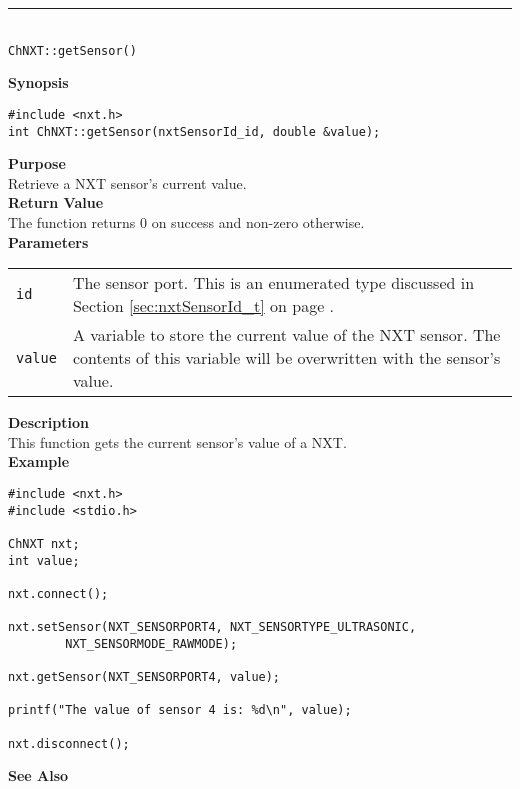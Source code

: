 \noindent
\vspace{5pt}
\rule{4.5in}{0.015in}\\
\noindent
{\LARGE \texttt{ChNXT::getSensor()}}\\
{}

\noindent
{\bf Synopsis}
\vspace{-8pt}
\begin{verbatim}
#include <nxt.h>
int ChNXT::getSensor(nxtSensorId_id, double &value);
\end{verbatim}

\noindent
{\bf Purpose}\\
Retrieve a NXT sensor's current value.\\

\noindent
{\bf Return Value}\\
The function returns 0 on success and non-zero otherwise.\\

\noindent
{\bf Parameters}\\
\vspace{-0.1in}
\begin{description}
\item               
\begin{tabular}{p{15 mm}p{145 mm}}
\texttt{id} & The sensor port. This is an enumerated type 
discussed in Section \ref{sec:nxtSensorId_t} on page
\pageref{sec:nxtSensorId_t}.\\
\texttt{value} & A variable to store the current value of the NXT 
sensor. The contents of this variable will be overwritten with the 
sensor's value.  \\
\end{tabular}
\end{description}

\noindent
{\bf Description}\\
This function gets the current sensor's value of a NXT.\\

\noindent
{\bf Example}\\
\begin{verbatim}
#include <nxt.h>
#include <stdio.h>

ChNXT nxt;
int value;

nxt.connect();

nxt.setSensor(NXT_SENSORPORT4, NXT_SENSORTYPE_ULTRASONIC,
		NXT_SENSORMODE_RAWMODE);

nxt.getSensor(NXT_SENSORPORT4, value);

printf("The value of sensor 4 is: %d\n", value);

nxt.disconnect();
\end{verbatim}

\noindent
{\bf See Also}\\

